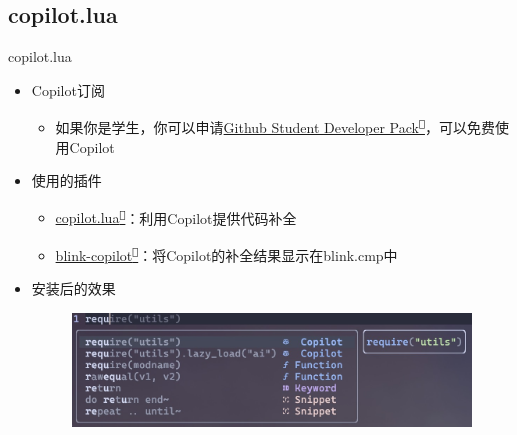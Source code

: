 \documentclass[aspectratio=169]{ctexbeamer}
\newcommand{\nerd}[1]{\texttt{#1}}
\newcommand{\link}[3][]{\href{#3}{#2\textsuperscript{\nerd{}}}}
\begin{document}
  \subsection{copilot.lua}
    \begin{frame}{copilot.lua}
      \begin{itemize}
        \item Copilot订阅
          \begin{itemize}
            \item 如果你是学生，你可以申请\link{Github Student Developer Pack}{https://education.github.com/pack}，可以免费使用Copilot %
          \end{itemize}
        \item 使用的插件
          \begin{itemize}
            \item \link{copilot.lua}{https://github.com/zbirenbaum/copilot.lua}：利用Copilot提供代码补全
            \item \link{blink-copilot}{https://github.com/fang2hou/blink-copilot}：将Copilot的补全结果显示在blink.cmp中
          \end{itemize}
        \item 安装后的效果
          \begin{figure}[H]
            \centering
            \includegraphics[width=0.6\linewidth]{./Figures/Copilot_Install_Result.jpg}
          \end{figure}
      \end{itemize}
    \end{frame}
\end{document}
